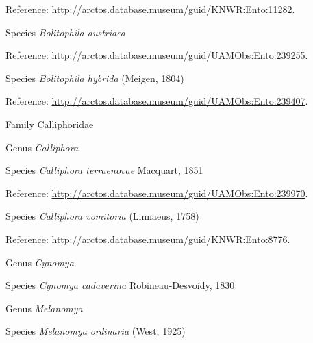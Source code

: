 \documentclass[9pt, article]{memoir}
\begin{document}
\begin{multicols}{2}
\vspace{6pt}Reference: 
\url{http://arctos.database.museum/guid/KNWR:Ento:11282}.

\vspace{6pt}\noindent\hspace{36pt}Species \textit{Bolitophila austriaca}


\vspace{6pt}Reference: 
\url{http://arctos.database.museum/guid/UAMObs:Ento:239255}.

\vspace{6pt}\noindent\hspace{36pt}Species \textit{Bolitophila hybrida} (Meigen, 1804)


\vspace{6pt}Reference: 
\url{http://arctos.database.museum/guid/UAMObs:Ento:239407}.

\vspace{6pt}\noindent\hspace{24pt}Family Calliphoridae


\vspace{6pt}\noindent\hspace{30pt}Genus \textit{Calliphora}


\vspace{6pt}\noindent\hspace{36pt}Species \textit{Calliphora terraenovae} Macquart, 1851


\vspace{6pt}Reference: 
\url{http://arctos.database.museum/guid/UAMObs:Ento:239970}.

\vspace{6pt}\noindent\hspace{36pt}Species \textit{Calliphora vomitoria} (Linnaeus, 1758)


\vspace{6pt}Reference: 
\url{http://arctos.database.museum/guid/KNWR:Ento:8776}.

\vspace{6pt}\noindent\hspace{30pt}Genus \textit{Cynomya}


\vspace{6pt}\noindent\hspace{36pt}Species \textit{Cynomya cadaverina} Robineau-Desvoidy, 1830


\vspace{6pt}\noindent\hspace{30pt}Genus \textit{Melanomya}


\vspace{6pt}\noindent\hspace{36pt}Species \textit{Melanomya ordinaria} (West, 1925)



\end{multicols}
\end{document}
